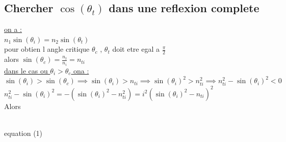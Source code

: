 \documentclass[12pt]{book}
\begin{document}
            \subsection{Chercher $\cos(\theta_t)$ dans une reflexion complete}
                \underline{on a :} \\
                $n_1\sin(\theta_i) = n_2\sin(\theta_t)$ \\
                pour obtien l angle critique $\theta_c $ , $\theta_t $ doit etre egal a $\frac{\pi}{2}$ \\
                alors $\sin(\theta_c) = \frac{n_t}{n_i} =n_{ti}$\\
                \underline{dans le cas ou $\theta_i > \theta_c$ ona :}\\
                $ \sin(\theta_i) > \sin(\theta_c) \implies \sin(\theta_i) > n_{ti} \implies \sin(\theta_i)^2 > n_{ti}^2 \implies n_{ti}^2 - \sin(\theta_i)^2 < 0 $\\
                $n_{ti}^2 - \sin(\theta_i)^2 = -(\sin(\theta_i)^2-n_{ti}^2) = i^2(\sin(\theta_i)^2 -n_{ti})^2$ \\
                Alors  \\
                \begin{center}
                     \\
                    equation (1)
                \end{center}
\end{document}
